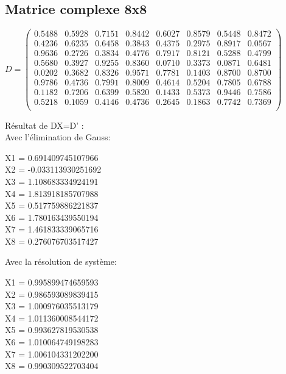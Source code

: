 \documentclass[a4paper,12pt]{report}
\begin{document}
\subsection{Matrice complexe 8x8}
\begin{center}
	$D=\begin{pmatrix}
	0.5488&0.5928&0.7151&0.8442&0.6027&0.8579&0.5448&0.8472\\
	0.4236&0.6235&0.6458&0.3843&0.4375&0.2975&0.8917&0.0567\\
	0.9636&0.2726&0.3834&0.4776&0.7917&0.8121&0.5288&0.4799\\
	0.5680&0.3927&0.9255&0.8360&0.0710&0.3373&0.0871&0.6481\\
	0.0202&0.3682&0.8326&0.9571&0.7781&0.1403&0.8700&0.8700\\
	0.9786&0.4736&0.7991&0.8009&0.4614&0.5204&0.7805&0.6788\\
	0.1182&0.7206&0.6399&0.5820&0.1433&0.5373&0.9446&0.7586\\
	0.5218&0.1059&0.4146&0.4736&0.2645&0.1863&0.7742&0.7369\\
	
	\end{pmatrix}$
\end{center}
\begin{center}
	Résultat de DX=D' :\\
	Avec l'élimination de Gauss:\\
\end{center}
\begin{center}
	X1 = 0.691409745107966\\
	X2 = -0.033113930251692\\
	X3 = 1.108683334924191\\
	X4 = 1.813918185707988\\
	X5 = 0.517759886221837\\
	X6 = 1.780163439550194\\
	X7 = 1.461833339065716\\
	X8 = 0.276076703517427\\
\end{center}
\begin{center}
	Avec la résolution de système:\\
\end{center}
\begin{center}
	X1 = 0.995899474659593\\
	X2 = 0.986593089839415\\
	X3 = 1.000976035513179\\
	X4 = 1.011360008544172\\
	X5 = 0.993627819530538\\
	X6 = 1.010064749198283\\
	X7 = 1.006104331202200\\
	X8 = 0.990309522703404\\
	
\end{center}
\end{document}
